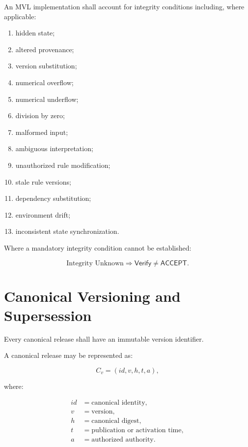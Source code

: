 \documentclass[11pt]{article}
\newcommand{\Verify}{\mathsf{Verify}}
\newcommand{\Accept}{\mathsf{ACCEPT}}
\begin{document}
An MVL implementation shall account for integrity conditions
including, where applicable:

\begin{enumerate}
    \item hidden state;
    \item altered provenance;
    \item version substitution;
    \item numerical overflow;
    \item numerical underflow;
    \item division by zero;
    \item malformed input;
    \item ambiguous interpretation;
    \item unauthorized rule modification;
    \item stale rule versions;
    \item dependency substitution;
    \item environment drift;
    \item inconsistent state synchronization.
\end{enumerate}

Where a mandatory integrity condition cannot be established:

\[
\boxed{
\text{Integrity Unknown}
\Rightarrow
\Verify\neq\Accept.
}
\]

\section{Canonical Versioning and Supersession}

Every canonical release shall have an immutable version
identifier.

A canonical release may be represented as:

\[
C_v=(id,v,h,t,a),
\]

where:

\begin{align*}
id &= \text{canonical identity},\\
v &= \text{version},\\
h &= \text{canonical digest},\\
t &= \text{publication or activation time},\\
a &= \text{authorized authority}.
\end{align*}
\end{document}
